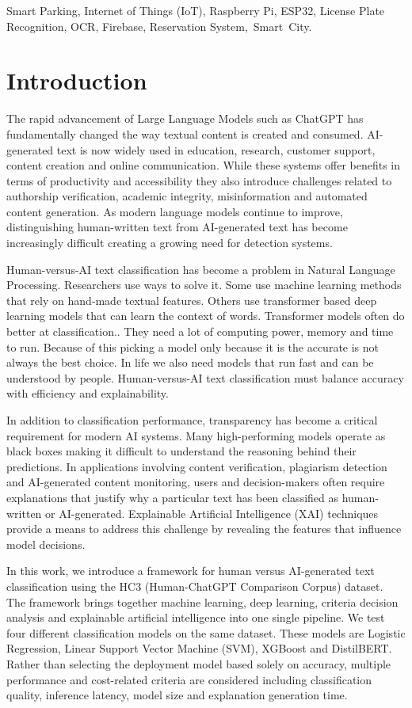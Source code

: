 \documentclass[conference]{IEEEtran}
\begin{document}
\begin{IEEEkeywords}
 Smart Parking, Internet of Things (IoT), Raspberry Pi, ESP32, License Plate Recognition, OCR, Firebase, Reservation System, Smart City.
\end{IEEEkeywords}

\section{Introduction}
The rapid advancement of Large Language Models such as ChatGPT has fundamentally changed the way textual content is created and consumed. AI-generated text is now widely used in education, research, customer support, content creation and online communication. While these systems offer benefits in terms of productivity and accessibility they also introduce challenges related to authorship verification, academic integrity, misinformation and automated content generation. As modern language models continue to improve, distinguishing human-written text from AI-generated text has become increasingly difficult creating a growing need for detection systems.

Human-versus-AI text classification has become a problem in Natural Language Processing. Researchers use ways to solve it. Some use machine learning methods that rely on hand‑made textual features. Others use transformer based deep learning models that can learn the context of words. Transformer models often do better at classification.. They need a lot of computing power, memory and time to run. Because of this picking a model only because it is the accurate is not always the best choice. In life we also need models that run fast and can be understood by people. Human-versus-AI text classification must balance accuracy with efficiency and explainability.

In addition to classification performance, transparency has become a critical requirement for modern AI systems. Many high-performing models operate as black boxes making it difficult to understand the reasoning behind their predictions. In applications involving content verification, plagiarism detection and AI-generated content monitoring, users and decision-makers often require explanations that justify why a particular text has been classified as human-written or AI-generated. Explainable Artificial Intelligence (XAI) techniques provide a means to address this challenge by revealing the features that influence model decisions.

In this work, we introduce a framework for human versus AI-generated text classification using the HC3 (Human-ChatGPT Comparison Corpus) dataset. The framework brings together machine learning, deep learning, criteria decision analysis and explainable artificial intelligence into one single pipeline. We test four different classification models on the same dataset. These models are Logistic Regression, Linear Support Vector Machine (SVM), XGBoost and DistilBERT. Rather than selecting the deployment model based solely on accuracy, multiple performance and cost-related criteria are considered including classification quality, inference latency, model size and explanation generation time.
\end{document}
